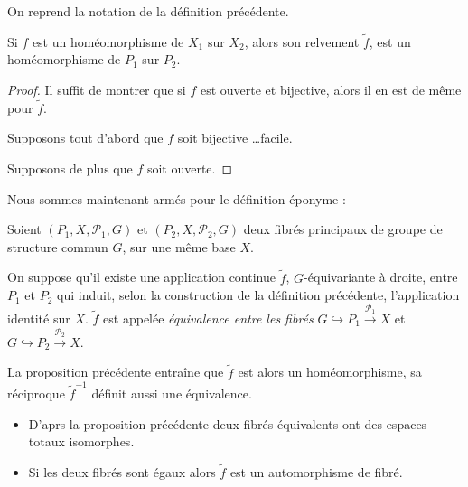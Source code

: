\begin{prop}
On reprend la notation de la d\'efinition pr\'ec\'edente.
\par
Si $f$ est un hom\'eomorphisme de $X_1$ sur $X_2$, alors son relvement $\tilde{f}$, est un hom\'eomorphisme de $P_1$ sur $P_2$.
\end{prop}

\begin{proof}
Il suffit de montrer que si $f$ est ouverte et bijective, alors il en est de m\^eme pour $\tilde{f}$.
\par
Supposons tout d'abord que $f$ soit bijective \dots facile.
\par
Supposons de plus que $f$ soit ouverte. \tr%
\end{proof}

Nous sommes maintenant arm\'es pour le d\'efinition \'eponyme :

\begin{defi}
Soient $(P_1,X,\mathcal{P}_1,G)$ et $(P_2,X,\mathcal{P}_2,G)$ deux fibr\'es principaux de groupe de structure commun $G$, sur une m\^eme base $X$.
\par
On suppose qu'il existe une application continue $\tilde{f}$, $G$-\'equivariante à droite, entre $P_1$ et $P_2$ qui induit, selon la construction de la d\'efinition pr\'ec\'edente, %
l'application identit\'e sur $X$. %
$\tilde{f}$ est appelée \emph{\'equivalence entre les fibr\'es} $G\hookrightarrow P_1 \xrightarrow{\mathcal{P}_1} X$ et $G\hookrightarrow P_2 \xrightarrow{\mathcal{P}_2} X$.
\par
La proposition pr\'ec\'edente entra\^ine que $\tilde{f}$ est alors un hom\'eomorphisme, sa réciproque $\tilde{f}^{-1}$ d\'efinit aussi une \'equivalence.
\end{defi}

\begin{rema}
\begin{itemize}
\item D'aprs la proposition pr\'ec\'edente deux fibr\'es \'equivalents ont des espaces totaux isomorphes.
\item Si les deux fibr\'es sont \'egaux alors $\tilde{f}$ est un automorphisme de fibr\'e.
\end{itemize}
\end{rema}

